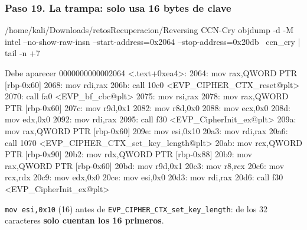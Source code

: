 \documentclass[11pt,a4paper]{article}
\begin{document}
\subsubsection*{Paso 19. La trampa: solo usa 16 bytes de clave}
\begin{comando}{/home/kali/Downloads/retosRecuperacion/Reversing CCN-Cry}
objdump -d -M intel --no-show-raw-insn --start-address=0x2064 --stop-address=0x20db \
  ccn_cry | tail -n +7
\end{comando}
\begin{salida}{Debe aparecer}
0000000000002064 <.text+0xea4>:
    2064:       mov    rax,QWORD PTR [rbp-0x60]
    2068:       mov    rdi,rax
    206b:       call   10c0 <EVP_CIPHER_CTX_reset@plt>
    2070:       call   fa0 <EVP_bf_cbc@plt>
    2075:       mov    rsi,rax
    2078:       mov    rax,QWORD PTR [rbp-0x60]
    207c:       mov    r9d,0x1
    2082:       mov    r8d,0x0
    2088:       mov    ecx,0x0
    208d:       mov    edx,0x0
    2092:       mov    rdi,rax
    2095:       call   f30 <EVP_CipherInit_ex@plt>
    209a:       mov    rax,QWORD PTR [rbp-0x60]
    209e:       mov    esi,0x10
    20a3:       mov    rdi,rax
    20a6:       call   1070 <EVP_CIPHER_CTX_set_key_length@plt>
    20ab:       mov    rcx,QWORD PTR [rbp-0x90]
    20b2:       mov    rdx,QWORD PTR [rbp-0x88]
    20b9:       mov    rax,QWORD PTR [rbp-0x60]
    20bd:       mov    r9d,0x1
    20c3:       mov    r8,rcx
    20c6:       mov    rcx,rdx
    20c9:       mov    edx,0x0
    20ce:       mov    esi,0x0
    20d3:       mov    rdi,rax
    20d6:       call   f30 <EVP_CipherInit_ex@plt>
\end{salida}
\begin{nota}\texttt{mov esi,0x10} (16) antes de \texttt{EVP\_CIPHER\_CTX\_set\_key\_length}: de los 32 caracteres \textbf{solo cuentan los 16 primeros}.\end{nota}
\end{document}
